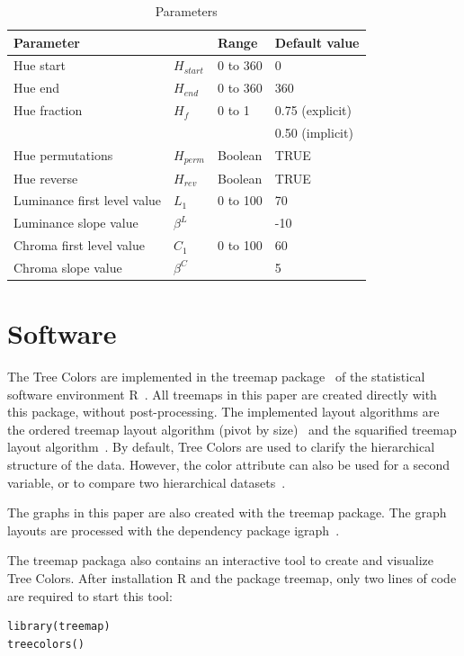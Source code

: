 \documentclass[journal]{vgtc}                %
\begin{document}
\begin{table}[htb]
\begin{footnotesize}
\begin{tabular}{llll}
\toprule
\multicolumn{2}{l}{Parameter    } & Range & Default value \\
\midrule
Hue start 				& $H_{start}$ &0 to 360  & 0      \\
Hue end   				& $H_{end}$ & 0 to 360 & 360       \\
Hue fraction 				& $H_f$	& 0 to 1 & 0.75 (explicit) \\
					&	&	 & 0.50 (implicit) \\
Hue permutations 			& $H_{perm}$ &Boolean & TRUE      \\
Hue reverse   			& $H_{rev}$ & Boolean  & TRUE      \\
Luminance first level value 	& $L_1$	& 0 to 100  & 70      \\
Luminance slope value 		& $\beta^L$ &       & -10       \\
Chroma first level value 		& $C_1$ &  0 to 100  & 60       \\
Chroma slope value 		& $\beta^C$ &     & 5       \\
\bottomrule
\end{tabular}
\end{footnotesize}
\caption{Parameters}\label{table:param}
\end{table}




\section{Software}

The Tree Colors are implemented in the treemap package~\cite{treemap} of the statistical software environment R~\cite{r2013}. All treemaps in this paper are created directly with this package, without post-processing. The implemented layout algorithms are the ordered treemap layout algorithm (pivot by size)~\cite{Bederson2002} and the squarified treemap layout algorithm~\cite{bruls99}. By default, Tree Colors are used to clarify the hierarchical structure of the data. However, the color attribute can also be used for a second variable, or to compare two hierarchical datasets~\cite{tennekes2011b}. 

The graphs in this paper are also created with the treemap package. The graph layouts are processed with the dependency package igraph~\cite{igraph}.

The treemap packaga also contains an interactive tool to create and visualize Tree Colors. After installation R and the package treemap, only two lines of code are required to start this tool:
\begin{lstlisting}
library(treemap)
treecolors()
\end{lstlisting}
\end{document}
